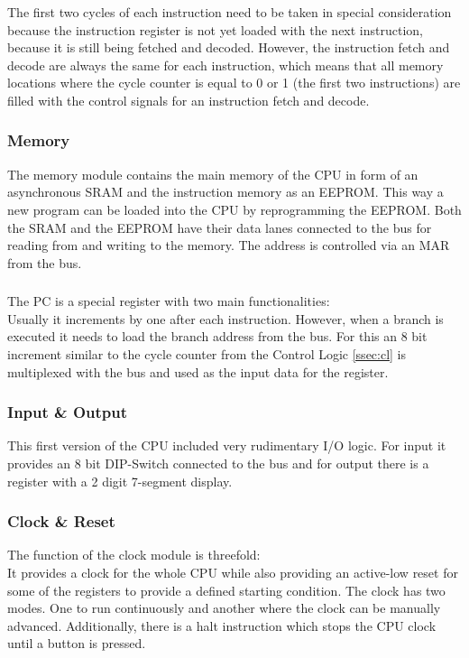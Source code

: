 The first two cycles of each instruction need to be taken in special consideration because the instruction register is not yet loaded with the next instruction, because it is still being fetched and decoded.
However, the instruction fetch and decode are always the same for each instruction, which means that all memory locations where the cycle counter is equal to 0 or 1 (the first two instructions) are filled with the control signals for an instruction fetch and decode.
\subsubsection{Memory}
The memory module contains the main memory of the \gls{CPU} in form of an asynchronous \gls{SRAM} and the instruction memory as an \gls{EEPROM}.
This way a new program can be loaded into the \gls{CPU} by reprogramming the \gls{EEPROM}.
Both the \gls{SRAM} and the \gls{EEPROM} have their data lanes connected to the bus for reading from and writing to the memory.
The address is controlled via an \gls{MAR} from the bus.
\subsubsection{}
The \gls{PC} is a special register with two main functionalities:\\
Usually it increments by one after each instruction.
However, when a branch is executed it needs to load the branch address from the bus.
For this an 8 bit increment similar to the cycle counter from the Control Logic \cref{ssec:cl} is multiplexed with the bus and used as the input data for the register.
\subsubsection{Input \& Output}
This first version of the \gls{CPU} included very rudimentary I/O logic.
For input it provides an 8 bit DIP-Switch connected to the bus and for output there is a register with a 2 digit 7-segment display.
\subsubsection{Clock \& Reset}
The function of the clock module is threefold:\\
It provides a clock for the whole \gls{CPU} while also providing an active-low reset for some of the registers to provide a defined starting condition.
The clock has two modes. One to run continuously and another where the clock can be manually advanced.
Additionally, there is a halt instruction which stops the \gls{CPU} clock until a button is pressed.
